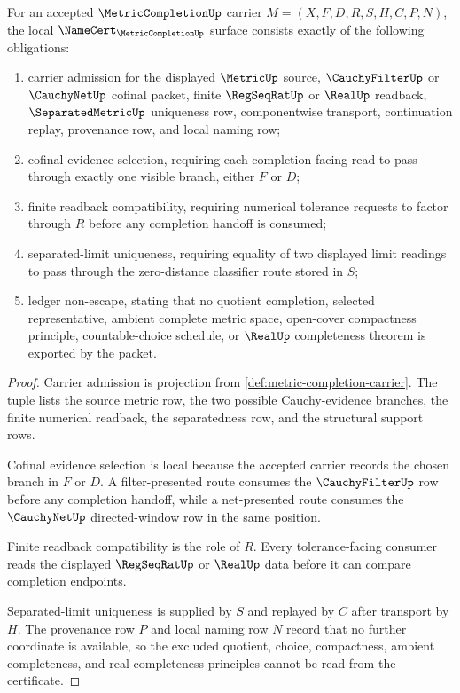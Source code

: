 \begin{theorem}
\label{thm:metric-completion-namecert-obligations}
For an accepted $\MetricCompletionUp$ carrier $M=(X,F,D,R,S,H,C,P,N)$, the local $\NameCert_{\MetricCompletionUp}$ surface consists exactly of the following obligations:
\begin{enumerate}
\item carrier admission for the displayed $\MetricUp$ source, $\CauchyFilterUp$ or $\CauchyNetUp$ cofinal packet, finite $\RegSeqRatUp$ or $\RealUp$ readback, $\SeparatedMetricUp$ uniqueness row, componentwise transport, continuation replay, provenance row, and local naming row;
\item cofinal evidence selection, requiring each completion-facing read to pass through exactly one visible branch, either $F$ or $D$;
\item finite readback compatibility, requiring numerical tolerance requests to factor through $R$ before any completion handoff is consumed;
\item separated-limit uniqueness, requiring equality of two displayed limit readings to pass through the zero-distance classifier route stored in $S$;
\item ledger non-escape, stating that no quotient completion, selected representative, ambient complete metric space, open-cover compactness principle, countable-choice schedule, or $\RealUp$ completeness theorem is exported by the packet.
\end{enumerate}
\end{theorem}
\begin{proof}
Carrier admission is projection from \autoref{def:metric-completion-carrier}. The tuple lists the source metric row, the two possible Cauchy-evidence branches, the finite numerical readback, the separatedness row, and the structural support rows.

Cofinal evidence selection is local because the accepted carrier records the chosen branch in $F$ or $D$. A filter-presented route consumes the $\CauchyFilterUp$ row before any completion handoff, while a net-presented route consumes the $\CauchyNetUp$ directed-window row in the same position.

Finite readback compatibility is the role of $R$. Every tolerance-facing consumer reads the displayed $\RegSeqRatUp$ or $\RealUp$ data before it can compare completion endpoints.

Separated-limit uniqueness is supplied by $S$ and replayed by $C$ after transport by $H$. The provenance row $P$ and local naming row $N$ record that no further coordinate is available, so the excluded quotient, choice, compactness, ambient completeness, and real-completeness principles cannot be read from the certificate.
\end{proof}

